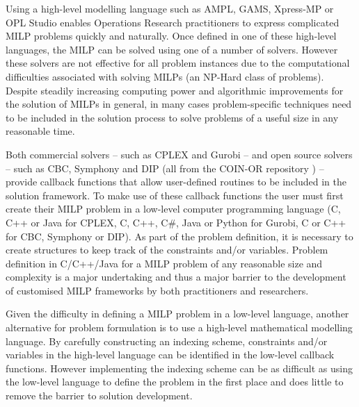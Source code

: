 Using a high-level modelling language such as AMPL, GAMS, Xpress-MP or OPL Studio enables Operations Research practitioners to express complicated \ac{MILP} problems quickly and naturally.
Once defined in one of these high-level languages, the \ac{MILP} can be solved using one of a number of solvers.
However these solvers are not effective for all problem instances due to the computational difficulties associated with solving \ac{MILP}s (an NP-Hard class of problems).
Despite steadily increasing computing power and algorithmic improvements for the solution of \ac{MILP}s in general, in many cases problem-specific techniques need to be included in the solution process to solve problems of a useful size in any reasonable time.

Both commercial solvers -- such as CPLEX and Gurobi -- and open source solvers -- such as CBC, Symphony and \acs{DIP} (all from the COIN-OR repository \cite{coin_or}) -- provide callback functions that allow user-defined routines to be included in the solution framework.
To make use of these callback functions the user must first create their \ac{MILP} problem in a low-level computer programming language (C, C++ or Java for CPLEX, C, C++, C\#, Java or Python for Gurobi, C or C++ for CBC, Symphony or \acs{DIP}).
As part of the problem definition, it is necessary to create structures to keep track of the constraints and\slash{}or variables.
Problem definition in C\slash{}C++\slash{}Java for a \ac{MILP} problem of any reasonable size and complexity is a major undertaking and thus a major barrier to the development of customised \ac{MILP} frameworks by both practitioners and researchers.

Given the difficulty in defining a \ac{MILP} problem in a low-level language, another alternative for problem formulation is to use a high-level mathematical modelling language.
By carefully constructing an indexing scheme, constraints and\slash{}or variables in the high-level language can be identified in the low-level callback functions.
However implementing the indexing scheme can be as difficult as using the low-level language to define the problem in the first place and does little to remove the barrier to solution development.


